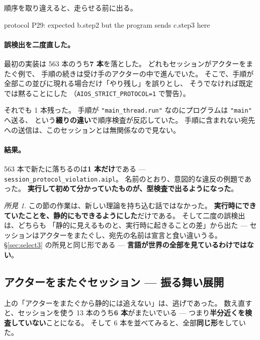 \documentclass[11pt,a4paper]{ltjsarticle}
\theoremstyle{definition}
\theoremstyle{remark}
\newtheorem{finding}[theorem]{所見}
\begin{document}
順序を取り違えると、走らせる前に出る。

\begin{term}
 protocol P29: expected b.step2 but the program sends c.step3 here
\end{term}

\paragraph{誤検出を二度直した。}
最初の実装は 563 本のうち\textbf{7 本}を落とした。
どれもセッションがアクターをまたぐ例で、
手順の続きは受け手のアクターの中で進んでいた。
そこで、手順が全部この並びに現れる場合だけ「やり残し」を誤りとし、
そうでなければ既定では黙ることにした
（\texttt{AIOS\_STRICT\_PROTOCOL=1} で警告）。

それでも 1 本残った。
手順が \texttt{"main\_thread.run"} なのにプログラムは \texttt{"main"} へ送る、
という\textbf{綴りの違い}で順序検査が反応していた。
手順に含まれない宛先への送信は、このセッションとは無関係なので見ない。

\paragraph{結果。}
563 本で新たに落ちるのは\textbf{1 本だけ}である ---
\texttt{session\_protocol\_violation.aipl}。
名前のとおり、意図的な違反の例題であった。
\textbf{実行して初めて分かっていたものが、型検査で出るようになった}。

\begin{finding}
この節の作業は、新しい理論を持ち込む話ではなかった。
\textbf{実行時にできていたことを、静的にもできるようにした}だけである。
そして二度の誤検出は、どちらも
「静的に見えるものと、実行時に起きることの差」から出た ---
セッションはアクターをまたぐし、宛先の名前は宣言と食い違いうる。
\S\ref{sec:select3} の所見と同じ形である ---
\textbf{言語が世界の全部を見ているわけではない}。
\end{finding}

\subsection{アクターをまたぐセッション --- 振る舞い展開}
\label{sec:crosssession}

上の「アクターをまたぐから静的には追えない」は、逃げであった。
数え直すと、セッションを使う 13 本のうち\textbf{6 本}がまたいでいる ---
つまり\textbf{半分近くを検査していない}ことになる。
そして 6 本を並べてみると、全部\textbf{同じ形}をしていた。
\end{document}
